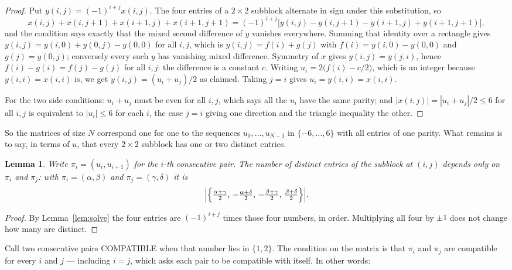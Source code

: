 \documentclass[11pt,a4paper]{article}
\theoremstyle{plain}
\newtheorem{lemma}[theorem]{Lemma}
\theoremstyle{definition}
\begin{document}
\begin{proof}
Put $y(i,j)=(-1)^{i+j}x(i,j)$. The four entries of a $2\times2$ subblock alternate in sign
under this substitution, so
\[
x(i,j)+x(i,j{+}1)+x(i{+}1,j)+x(i{+}1,j{+}1)
=(-1)^{i+j}\bigl[y(i,j)-y(i,j{+}1)-y(i{+}1,j)+y(i{+}1,j{+}1)\bigr],
\]
and the condition says exactly that the mixed second difference of $y$ vanishes everywhere.
Summing that identity over a rectangle gives
$y(i,j)=y(i,0)+y(0,j)-y(0,0)$ for all $i,j$, which is $y(i,j)=f(i)+g(j)$ with
$f(i)=y(i,0)-y(0,0)$ and $g(j)=y(0,j)$; conversely every such $y$ has vanishing mixed
difference. Symmetry of $x$ gives $y(i,j)=y(j,i)$, hence $f(i)-g(i)=f(j)-g(j)$ for all $i,j$:
the difference is a constant $c$. Writing $u_i=2\bigl(f(i)-c/2\bigr)$, which is an integer
because $y(i,i)=x(i,i)$ is, we get $y(i,j)=(u_i+u_j)/2$ as claimed. Taking $j=i$ gives
$u_i=y(i,i)=x(i,i)$.

For the two side conditions: $u_i+u_j$ must be even for all $i,j$, which says all the $u_i$ have
the same parity; and $|x(i,j)|=|u_i+u_j|/2\le6$ for all $i,j$ is equivalent to $|u_i|\le6$
for each $i$, the case $j=i$ giving one direction and the triangle inequality the other.
\end{proof}

So the matrices of size $N$ correspond one for one to the sequences $u_0,\dots,u_{N-1}$ in
$\{-6,\dots,6\}$ with all entries of one parity. What remains is to say, in terms of $u$,
that every $2\times2$ subblock has one or two distinct entries.

\begin{lemma}\label{lem:block}
Write $\pi_i=(u_i,u_{i+1})$ for the $i$-th consecutive pair. The number of distinct entries of
the subblock at $(i,j)$ depends only on $\pi_i$ and $\pi_j$: with $\pi_i=(\alpha,\beta)$ and
$\pi_j=(\gamma,\delta)$ it is
\[
\Bigl|\Bigl\{\tfrac{\alpha+\gamma}{2},\,-\tfrac{\alpha+\delta}{2},\,
-\tfrac{\beta+\gamma}{2},\,\tfrac{\beta+\delta}{2}\Bigr\}\Bigr| .
\]
\end{lemma}

\begin{proof}
By Lemma~\ref{lem:solve} the four entries are $(-1)^{i+j}$ times those four numbers, in
order. Multiplying all four by $\pm1$ does not change how many are distinct.
\end{proof}

Call two consecutive pairs COMPATIBLE when that number lies in $\{1,2\}$. The condition on the
matrix is that $\pi_i$ and $\pi_j$ are compatible for every $i$ and $j$ --- including $i=j$,
which asks each pair to be compatible with itself. In other words:
\end{document}
